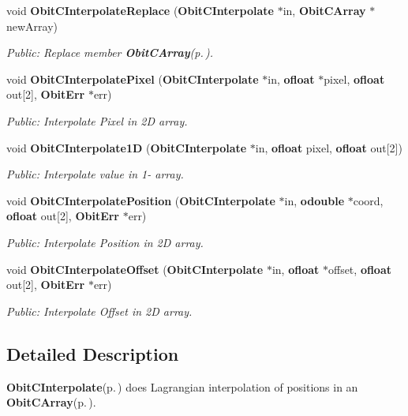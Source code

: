 \begin{CompactItemize}
void {\bf Obit\-CInterpolate\-Replace} ({\bf Obit\-CInterpolate} $\ast$in, {\bf Obit\-CArray} $\ast$new\-Array)
\begin{CompactList}\small\item\em Public: Replace member {\bf Obit\-CArray}{\rm (p.\,\pageref{structObitCArray})}. \item\end{CompactList}\item 
void {\bf Obit\-CInterpolate\-Pixel} ({\bf Obit\-CInterpolate} $\ast$in, {\bf ofloat} $\ast$pixel, {\bf ofloat} out[2], {\bf Obit\-Err} $\ast$err)
\begin{CompactList}\small\item\em Public: Interpolate Pixel in 2D array. \item\end{CompactList}\item 
void {\bf Obit\-CInterpolate1D} ({\bf Obit\-CInterpolate} $\ast$in, {\bf ofloat} pixel, {\bf ofloat} out[2])
\begin{CompactList}\small\item\em Public: Interpolate value in 1- array. \item\end{CompactList}\item 
void {\bf Obit\-CInterpolate\-Position} ({\bf Obit\-CInterpolate} $\ast$in, {\bf odouble} $\ast$coord, {\bf ofloat} out[2], {\bf Obit\-Err} $\ast$err)
\begin{CompactList}\small\item\em Public: Interpolate Position in 2D array. \item\end{CompactList}\item 
void {\bf Obit\-CInterpolate\-Offset} ({\bf Obit\-CInterpolate} $\ast$in, {\bf ofloat} $\ast$offset, {\bf ofloat} out[2], {\bf Obit\-Err} $\ast$err)
\begin{CompactList}\small\item\em Public: Interpolate Offset in 2D array. \item\end{CompactList}\end{CompactItemize}


\subsection{Detailed Description}
{\bf Obit\-CInterpolate}{\rm (p.\,\pageref{structObitCInterpolate})} does Lagrangian interpolation of positions in an {\bf Obit\-CArray}{\rm (p.\,\pageref{structObitCArray})}. 

